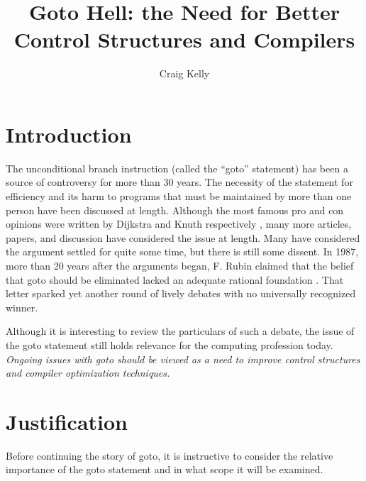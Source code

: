 \documentclass[letterpaper,12pt]{article}
\begin{document}
\setlength{\pdfpageheight}{\paperheight}
\setlength{\pdfpagewidth}{\paperwidth}

\title{Goto Hell: the Need for Better Control Structures and Compilers}
\author{Craig Kelly}
\maketitle


\section{Introduction}

The unconditional branch instruction (called the ``goto'' statement) has been
a source of controversy for more than 30 years.
The necessity of the statement for efficiency and its harm to programs that
must be maintained by more than one person have been discussed at length.
Although the most famous pro and con opinions were written by Dijkstra and Knuth
respectively \cite{dijkstra,knuth}, many more articles, papers, and discussion
have considered the issue at length.
Many have considered the argument settled for quite some time, but there is
still some dissent.  In 1987, more than 20 years after the arguments began,
F. Rubin claimed that the belief that goto should be eliminated lacked
an adequate rational foundation \cite{rubin}.
That letter sparked yet another round of lively debates
\cite{jonsson} with no universally recognized winner.

Although it is interesting to review the particulars of such a debate,
the issue of the goto statement still holds relevance for the computing
profession today.
\emph{Ongoing issues with goto should be viewed as a need to improve control
 structures and compiler optimization techniques.}

\section{Justification}

Before continuing the story of goto, it is instructive to consider the relative
importance of the goto statement and in what scope it will be examined.
\end{document}

